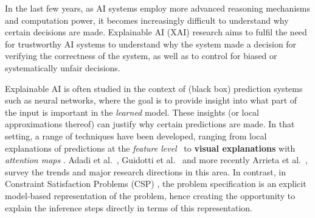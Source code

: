 

In the last few years, as AI systems employ more advanced reasoning mechanisms and computation power, it becomes increasingly difficult to understand why certain decisions are made. 
Explainable AI (XAI) research aims to fulfil the need for trustworthy AI systems to understand why the system made a decision for verifying the correctness of the system, as well as to control for biased or systematically unfair decisions.

Explainable AI is often studied in the context of (black box) prediction systems such as neural networks, where the goal is to provide insight into what part of the input is important in the \textit{learned} model. 
These insights (or local approximations thereof) can justify why certain predictions are made. 
In that setting, a range of techniques have been developed, ranging from local explanations of predictions at the \textit{feature level}~\cite{ribeiro2016should,lundberg2017unified} to \textbf{visual explanations} with \textit{attention maps} \cite{selvaraju2017grad}. %
Adadi et al.~\cite{Adadi_2018}, Guidotti et al.~\cite{guidotti2018survey} and more recently Arrieta et al.~\cite{Barredo_Arrieta_2020}, survey the trends and  major research directions in this area.
In contrast, in Constraint Satisfaction Problems (CSP) \cite{fai/Rossi06}, the problem specification is an explicit model-based representation of the problem, hence creating the opportunity to explain the inference steps directly in terms of this representation.






